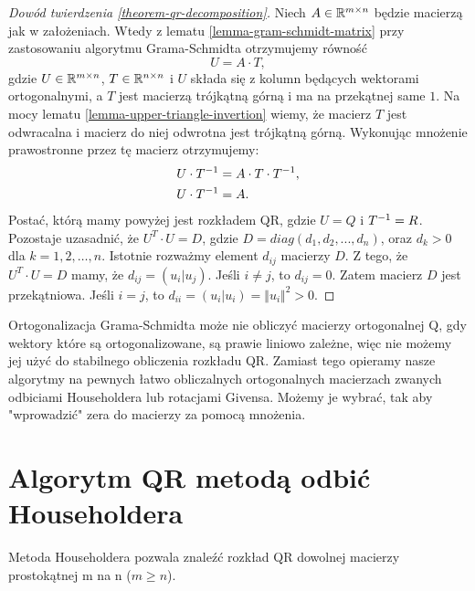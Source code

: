 \documentclass[12pt,a4paper]{report}
\newcommand{\mx}[1]{{#1}}
\begin{document}
\begin{proof}[Dowód twierdzenia \ref{theorem-qr-decomposition}]
Niech $\mx{A} \in \setR^{m \times n}$ będzie macierzą jak w założeniach. Wtedy z lematu \ref{lemma-gram-schmidt-matrix} przy zastosowaniu algorytmu Grama-Schmidta otrzymujemy równość
$$
\mx{U} = \mx{A} \cdot \mx{T},
$$  
gdzie $\mx{U} \in \setR^{m \times n}$, $\mx{T} \in \setR^{n \times n}$ i $\mx{U}$ składa się z kolumn będących wektorami ortogonalnymi, a $\mx{T}$ jest macierzą trójkątną górną i ma na przekątnej same $1$.  
Na mocy lematu \ref{lemma-upper-triangle-invertion} wiemy, że macierz $\mx{T}$ jest odwracalna i macierz do niej odwrotna jest trójkątną górną. Wykonując mnożenie prawostronne przez tę macierz otrzymujemy:
\begin{align*}
\mx{U} \cdot \inverse{\mx{T}} & = \mx{A}\cdot\mx{T}\cdot \inverse{\mx{T}}, \\
\mx{U} \cdot \inverse{\mx{T}} & = \mx{A}.
\end{align*}  
Postać, którą mamy powyżej jest rozkładem QR, gdzie $\mx{U} = \mx{Q}$ i $\inverse{\mx{T}} = \mx{R}$. Pozostaje uzasadnić, że $\mx{U}^{T} \cdot \mx{U} = \mx{D}$, gdzie $D= diag (d_{1}, d_{2}, ..., d_{n})$, oraz $d_{k}>0$ dla $k = 1, 2, \ldots, n$. Istotnie rozważmy element $d_{ij}$ macierzy $\mx{D}$. Z tego, że $\mx{U}^{T} \cdot \mx{U} = \mx{D}$ mamy, że $d_{ij} = (u_{i}|u_{j})$. Jeśli $i \neq j$, to $d_{ij}=0$. Zatem macierz $\mx{D}$ jest przekątniowa. Jeśli $i=j$, to $d_{ii}=(u_{i}|u_{i}) = \Vert u_{i} \Vert ^{2} >0$.

\end{proof}



Ortogonalizacja Grama-Schmidta może nie obliczyć macierzy ortogonalnej Q, gdy wektory które są ortogonalizowane, są prawie liniowo zależne, więc nie możemy jej użyć do stabilnego obliczenia rozkładu QR. Zamiast tego opieramy nasze algorytmy na pewnych łatwo obliczalnych ortogonalnych macierzach zwanych odbiciami Householdera lub rotacjami Givensa. Możemy je wybrać, tak aby "wprowadzić" zera do macierzy za pomocą mnożenia.



\section{Algorytm QR metodą odbić Householdera}

Metoda Householdera pozwala znaleźć rozkład QR dowolnej macierzy prostokątnej m na n ($m\ge n$).
\end{document}
